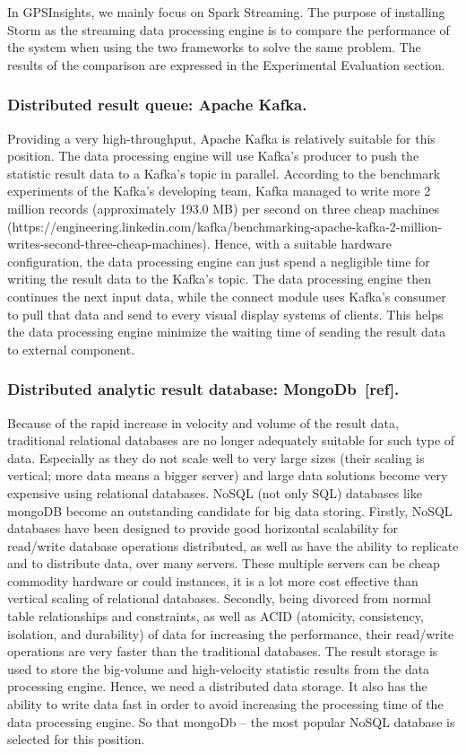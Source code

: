 \documentclass{acm_proc_article-sp}
\begin{document}
In GPSInsights, we mainly focus on Spark Streaming. The purpose of installing Storm as the streaming data processing engine is to compare the performance of the system when using the two frameworks to solve the same problem. The results of the comparison are expressed in the Experimental Evaluation section.


\subsubsection{Distributed result queue: Apache Kafka.} Providing a very high-throughput, Apache Kafka is relatively suitable for this position. The data processing engine will use Kafka's producer to push the statistic result data to a Kafka's topic in parallel. According to the benchmark experiments of the Kafka's developing team,  Kafka managed to write more 2 million records (approximately 193.0 MB)  per second on three cheap machines (https://engineering.linkedin.com/kafka/benchmarking-apache-kafka-2-million-writes-second-three-cheap-machines). Hence, with a suitable hardware configuration, the data processing engine can just spend a negligible time for writing the result data to the Kafka's topic. The data processing engine then continues the next input data, while the connect module uses Kafka's consumer to pull that data and send to every visual display systems of clients. This helps the data processing engine minimize the waiting time of sending the result data to external component.



\subsubsection{Distributed analytic result database: MongoDb~[ref].}
Because of the rapid increase in velocity and volume of the result data, traditional relational databases are no longer adequately suitable for such type of data. Especially as they do not scale well to very large sizes (their scaling is vertical; more data means a bigger server) and large data solutions become very expensive using relational databases. NoSQL (not only SQL) databases like mongoDB become an outstanding candidate for big data storing. Firstly, NoSQL databases have been designed to provide good horizontal scalability for read/write database operations distributed, as well as  have the ability to replicate and to distribute data, over many servers. These multiple servers can be cheap commodity hardware or could instances, it is a lot more cost effective than vertical scaling of relational databases. Secondly, being divorced from normal table relationships and constraints, as well as ACID (atomicity, consistency, isolation, and durability) of data for increasing the performance, their read/write operations are very faster than the traditional databases. 
The result storage is used to store the big-volume and high-velocity statistic results from the data processing engine. Hence, we need a distributed data storage. It also has the ability to write data fast in order to avoid increasing the processing time of the data processing engine. So that mongoDb – the most popular NoSQL database is selected for this position.
\end{document}
